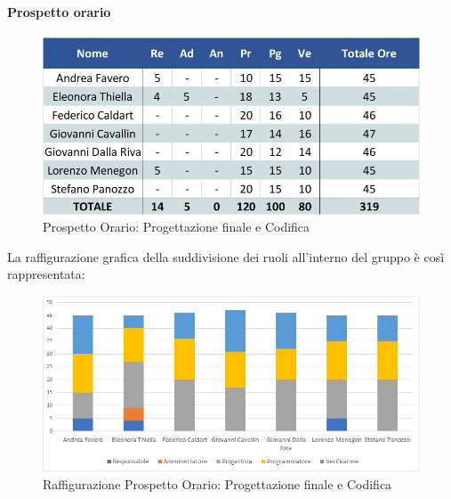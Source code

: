 \paragraph{Prospetto orario}
\begin{figure}[h!]
	\centerline{\includegraphics[scale=0.4]{img/Preventivo/ProgettazioneFinaleCodificaOrario.jpg}}
	\caption{Prospetto Orario: Progettazione finale e Codifica}
\end{figure}
La raffigurazione grafica della suddivisione dei ruoli all'interno del gruppo è così rappresentata: 
\begin{figure}[h!]
	\centerline{\includegraphics[scale=0.4]{img/Preventivo/Istogrammi/ProgettazioneFinaleCodifica.jpg}}
	\caption{Raffigurazione Prospetto Orario: Progettazione finale e Codifica}
\end{figure}
